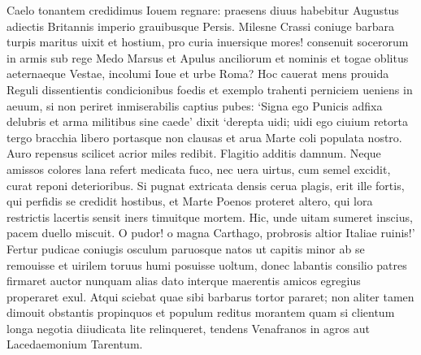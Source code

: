 \documentclass{book}
\newenvironment {carmen} [1] [\relax] 
  {\Titulus \Versus \incipit*\numerus{1}#1}
  {\endVersus}
\newcommand {\Alcaic}    {\Forma \strophae {0 \poena 01 \poena 2}}
\begin{document}
\begin{carmen}[\Alcaic]


Caelo tonantem credidimus Iouem
 regnare: praesens diuus habebitur
      Augustus adiectis Britannis
      imperio grauibusque Persis. 
Milesne Crassi coniuge barbara               
 turpis maritus uixit et hostium,
      pro curia inuersique mores!
      consenuit socerorum in armis 
sub rege Medo Marsus et Apulus
 anciliorum et nominis et togae               
      oblitus aeternaeque Vestae,
      incolumi Ioue et urbe Roma? 
Hoc cauerat mens prouida Reguli
 dissentientis condicionibus
      foedis et exemplo trahenti               
      perniciem ueniens in aeuum, 
si non periret inmiserabilis
 captius pubes: `Signa ego Punicis
      adfixa delubris et arma
      militibus sine caede' dixit                
`derepta uidi; uidi ego ciuium
 retorta tergo bracchia libero
      portasque non clausas et arua
      Marte coli populata nostro. 
Auro repensus scilicet acrior               
 miles redibit. Flagitio additis
      damnum. Neque amissos colores
      lana refert medicata fuco, 
nec uera uirtus, cum semel excidit,
 curat reponi deterioribus.               
      Si pugnat extricata densis
      cerua plagis, erit ille fortis, 
qui perfidis se credidit hostibus,
 et Marte Poenos proteret altero,
      qui lora restrictis lacertis               
      sensit iners timuitque mortem. 
Hic, unde uitam sumeret inscius,
 pacem duello miscuit. O pudor!
      o magna Carthago, probrosis
      altior Italiae ruinis!'                
Fertur pudicae coniugis osculum
 paruosque natos ut capitis minor
      ab se remouisse et uirilem
      toruus humi posuisse uoltum, 
donec labantis consilio patres               
 firmaret auctor nunquam alias dato
      interque maerentis amicos
      egregius properaret exul. 
Atqui sciebat quae sibi barbarus
 tortor pararet; non aliter tamen               
      dimouit obstantis propinquos
      et populum reditus morantem 
quam si clientum longa negotia
 diiudicata lite relinqueret,
      tendens Venafranos in agros               
      aut Lacedaemonium Tarentum. 

\end{carmen}
\end{document}
